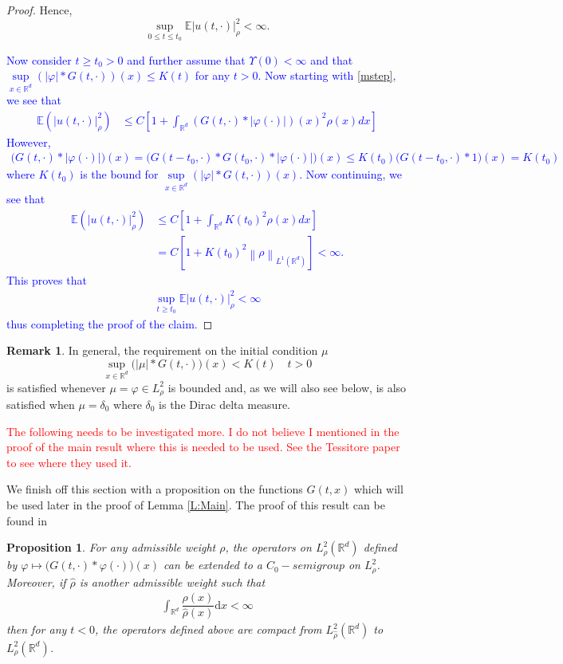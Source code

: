 \documentclass[a4paper,11pt]{article}%
\numberwithin{equation}{section}
\theoremstyle{plain}
\newtheorem{proposition}[theorem]{Proposition}
\theoremstyle{definition}
\newtheorem{remark}[theorem]{Remark}
\newcommand{\R}{\mathbb{R}}
\newcommand{\E}{\mathbb{E}}
\newcommand{\Norm}[1]{\left\|  #1   \right\|}
\newcommand{\ud}{\ensuremath{ \mathrm{d} }}
\begin{document}
\begin{proof}
Hence,
 \[
 \sup_{0 \le t \le t_0}\E |u(t,\cdot)|_\rho^2 < \infty.
 \]

\textcolor{blue}{Now consider $t\ge t_0>0$ and further assume that $\Upsilon(0) < \infty$ and that $\sup\limits_{x\in \R^d}(|\varphi|*G(t,\cdot))(x) \le K(t)$ for any $t>0$. Now starting with \eqref{mstep}, we see that
\begin{align*}
	\E\left(| u(t,\cdot)|_\rho^2\right)
	   & \le  C\left[1+\int_{\R^d}(G(t,\cdot)*|\varphi(\cdot)|)(x)^2\rho(x)dx\right]
\end{align*}
However,
\begin{align*}
\big(G(t,\cdot)*|\varphi(\cdot)|\big)(x) = \big(G(t-t_0,\cdot)*G(t_0,\cdot)*|\varphi(\cdot)|\big)(x) \le K(t_0) \big(G(t-t_0,\cdot)*1\big)(x) = K(t_0)
\end{align*}
where $K(t_0)$ is the bound for $\sup\limits_{x\in \R^d}(|\varphi|*G(t,\cdot))(x)$. Now continuing, we see that
\begin{align*}
	\E\left(| u(t,\cdot)|_\rho^2\right)& \le  C\left[1+\int_{\R^d}K(t_0)^2\rho(x)dx\right]
	\\ & = C \left[ 1+ K(t_0)^2\Norm{\rho}_{L^1(\R^d)}  \right] < \infty.
\end{align*}
This proves that
\begin{align*}
	\sup_{t \ge t_0}\E |u(t,\cdot)|_\rho^2 < \infty
\end{align*}
thus completing the proof of the claim.}
\end{proof}

\begin{remark}
	In general, the requirement on the initial condition $\mu$
		\[
			\sup\limits_{x\in \R^d}\big(|\mu|*G(t,\cdot)\big)(x) < K(t) \quad t>0
		\]
	is satisfied whenever $\mu=\varphi \in L^2_\rho$ is bounded and, as we will also see below, is also satisfied when $\mu = \delta_0$ where $\delta_0$ is the Dirac delta measure.
\end{remark}


\textcolor{red}{The following needs to be investigated more. I do not believe I mentioned in the proof of the main result where this is needed to be used. See the Tessitore paper to see where they used it.}

We finish off this section with a proposition on the functions $G(t,x)$ which will be used later in the proof of Lemma \ref{L:Main}. The proof of this result can be found in \cite{TessitoreZabczyk98M} \\

\begin{proposition}
	\label{P:weight}
	For any admissible weight $\rho$, the operators on $L^2_\rho(\R^d)$ defined by $\varphi \mapsto \big(G(t,\cdot)*\varphi(\cdot)\big)(x)$ can be extended to a $C_0-semigroup$ on $L^2_\rho$. Moreover, if $\hat\rho$ is another admissible weight such that
	\begin{align*}
		\int_{\R^d}\dfrac{\rho(x)}{\hat\rho(x)}\ud x < \infty
	\end{align*}
	then for any $t<0$, the operators defined above are compact from $L^2_{\hat\rho}(\R^d)$ to $L^2_\rho(\R^d)$.
\end{proposition}
\end{document}
